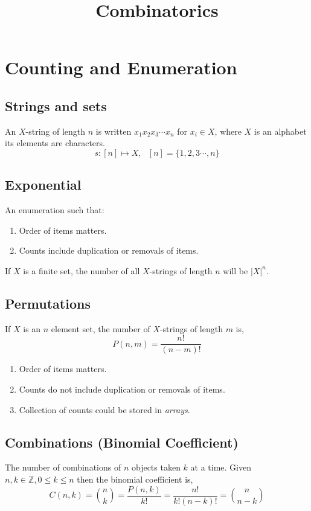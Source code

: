 \documentclass{article}
\title{\vspace{-3cm} Combinatorics}
\author{}
\date{}
\begin{document}
\maketitle
\vspace{-1.5cm}
\tableofcontents
\newpage

\section{Counting and Enumeration}
\subsection{Strings and sets}
An $X$-string of length $n$ is written $x_1x_2x_3 \cdots x_n$ for $x_i \in X$, where $X$ is an alphabet its elements are  characters.
\[
s: [n] \mapsto X, \ \ \  [n] = \{ 1, 2,3 \cdots, n \}
\]

\subsection{Exponential}
An enumeration such that: \begin{enumerate}
    \item Order of items matters.
    \item Counts include duplication or removals of items.
\end{enumerate} 

If $X$ is a finite set, the number of all $X$-strings of length $n$ will be $|X|^n$.

\subsection{Permutations}
If $X$ is an $n$ element set, the number of $X$-strings of length $m$ is,
\[
    P(n,m) = \frac{n!}{(n-m)!}
\]

\begin{enumerate}
    \item Order of items matters.
    \item Counts do not include duplication or removals of items.
    \item Collection of counts could be stored in \emph{arrays}. 
\end{enumerate} 


\subsection{Combinations (Binomial Coefficient)}
The number of combinations of $n$ objects taken $k$ at a time. Given $n, k \in \mathbb Z, 0 \leq k \leq n$ then the binomial coefficient is,
\[
    C(n, k) = \binom{n}{k} = \frac{P(n,k)}{k!} = \frac{n!}{k!(n-k)!} = \binom{n}{n-k}
\]
\end{document}

